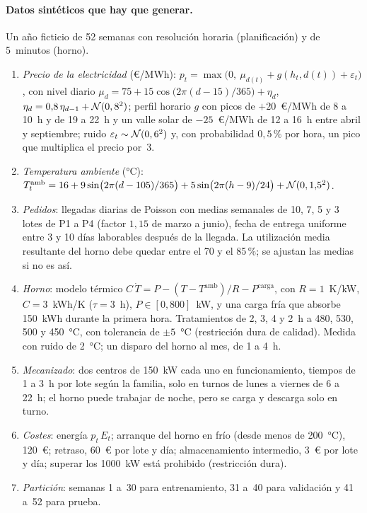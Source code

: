 \paragraph{Datos sintéticos que hay que generar.} Un año ficticio de 52 semanas con resolución horaria (planificación) y de 5~minutos (horno).
\begin{enumerate}[label=(\roman*)]
  \item \emph{Precio de la electricidad} (€/MWh): $p_t=\max\bigl(0,\ \mu_{d(t)}+g(h_t,d(t))+\varepsilon_t\bigr)$, con nivel diario $\mu_d=75+15\cos\bigl(2\pi(d-15)/365\bigr)+\eta_d$, $\eta_d=0{,}8\,\eta_{d-1}+\mathcal{N}(0,8^{2})$; perfil horario $g$ con picos de $+20$~€/MWh de 8 a 10~h y de 19 a 22~h y un valle solar de $-25$~€/MWh de 12 a 16~h entre abril y septiembre; ruido $\varepsilon_t\sim\mathcal{N}(0,6^{2})$ y, con probabilidad $0{,}5\,\%$ por hora, un pico que multiplica el precio por~3.
  \item \emph{Temperatura ambiente} (°C): $T^{\mathrm{amb}}_t=16+9\sin\bigl(2\pi(d-105)/365\bigr)+5\sin\bigl(2\pi(h-9)/24\bigr)+\mathcal{N}(0,1{,}5^{2})$.
  \item \emph{Pedidos}: llegadas diarias de Poisson con medias semanales de 10, 7, 5 y 3 lotes de P1 a P4 (factor $1{,}15$ de marzo a junio), fecha de entrega uniforme entre 3 y 10 días laborables después de la llegada. La utilización media resultante del horno debe quedar entre el 70 y el 85\,\%; se ajustan las medias si no es así.
  \item \emph{Horno}: modelo térmico $C\,\dot T=P-(T-T^{\mathrm{amb}})/R-P^{\mathrm{carga}}$, con $R=1$~K/kW, $C=3$~kWh/K ($\tau=3$~h), $P\in[0,800]$~kW, y una carga fría que absorbe 150~kWh durante la primera hora. Tratamientos de 2, 3, 4 y 2~h a 480, 530, 500 y 450~°C, con tolerancia de $\pm5$~°C (restricción dura de calidad). Medida con ruido de 2~°C; un disparo del horno al mes, de 1 a 4~h.
  \item \emph{Mecanizado}: dos centros de 150~kW cada uno en funcionamiento, tiempos de 1 a 3~h por lote según la familia, solo en turnos de lunes a viernes de 6 a 22~h; el horno puede trabajar de noche, pero se carga y descarga solo en turno.
  \item \emph{Costes}: energía $p_t\,E_t$; arranque del horno en frío (desde menos de 200~°C), 120~€; retraso, 60~€ por lote y día; almacenamiento intermedio, 3~€ por lote y día; superar los 1000~kW está prohibido (restricción dura).
  \item \emph{Partición}: semanas 1 a~30 para entrenamiento, 31 a~40 para validación y 41 a~52 para prueba.
\end{enumerate}

